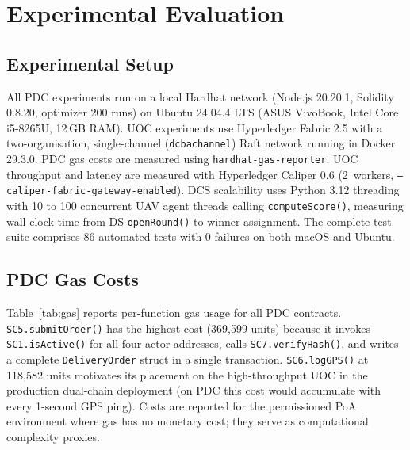 \documentclass[sigplan,screen]{acmart}
\newcommand{\pdc}{PDC\xspace}
\newcommand{\uoc}{UOC\xspace}
\begin{document}
\section{Experimental Evaluation}\label{sec:eval}

\subsection{Experimental Setup}

All PDC experiments run on a local Hardhat network (Node.js 20.20.1,
Solidity 0.8.20, optimizer 200 runs) on Ubuntu 24.04.4 LTS
(ASUS VivoBook, Intel Core i5-8265U, 12\,GB RAM).
\uoc experiments use Hyperledger Fabric 2.5 with a two-organisation,
single-channel (\texttt{dcbachannel}) Raft network running in Docker 29.3.0.
\pdc gas costs are measured using \texttt{hardhat-gas-reporter}.
\uoc throughput and latency are measured with Hyperledger Caliper 0.6
(2~workers, \texttt{--caliper-fabric-gateway-enabled}).
DCS scalability uses Python 3.12 threading with 10 to 100 concurrent UAV
agent threads calling \texttt{computeScore()}, measuring wall-clock time from
DS \texttt{openRound()} to winner assignment.
The complete test suite comprises 86 automated tests with 0 failures on
both macOS and Ubuntu.

\subsection{PDC Gas Costs}

Table~\ref{tab:gas} reports per-function gas usage for all \pdc contracts.
\texttt{SC5.submitOrder()} has the highest cost (369,599 units) because it
invokes \texttt{SC1.isActive()} for all four actor addresses, calls
\texttt{SC7.verifyHash()}, and writes a complete \texttt{DeliveryOrder} struct
in a single transaction.
\texttt{SC6.logGPS()} at 118,582 units motivates its placement on the
high-throughput \uoc in the production dual-chain deployment (on PDC this
cost would accumulate with every 1-second GPS ping).
Costs are reported for the permissioned PoA environment where gas has no
monetary cost; they serve as computational complexity proxies.
\end{document}
